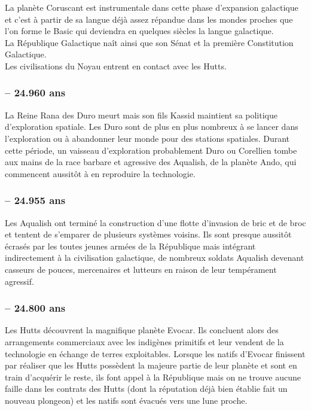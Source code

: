 \documentclass[twoside]{article}
\begin{document}
La planète Coruscant est instrumentale dans cette phase d'expansion galactique et c'est à partir de sa langue déjà assez répandue dans les mondes proches que l'on forme le Basic qui deviendra en quelques siècles la langue galactique. \\

La République Galactique na\^{i}t ainsi que son Sénat et la première Constitution Galactique. \\

Les civilisations du Noyau entrent en contact avec les Hutts. 
\subsubsection*{-- 24.960 ans}
La Reine Rana des Duro meurt mais son fils Kassid maintient sa politique d'exploration spatiale. Les Duro sont de plus en plus nombreux à se lancer dans l'exploration ou à abandonner leur monde pour des stations spatiales. Durant cette période, un vaisseau d'exploration probablement Duro ou Corellien tombe aux mains de la race barbare et agressive des Aqualish, de la planète Ando, qui commencent aussitôt à en reproduire la technologie. 
\subsubsection*{-- 24.955 ans}
Les Aqualish ont terminé la construction d'une flotte d'invasion de bric et de broc et tentent de s'emparer de plusieurs systèmes voisins. Ils sont presque aussitôt écrasés par les toutes jeunes armées de la République mais intégrant indirectement à la civilisation galactique, de nombreux soldats Aqualish devenant casseurs de pouces, mercenaires et lutteurs en raison de leur tempérament agressif.
\subsubsection*{-- 24.800 ans}
Les Hutts découvrent la magnifique planète Evocar. Ils concluent alors des arrangements commerciaux avec les indigènes primitifs et leur vendent de la technologie en échange de terres exploitables. Lorsque les natifs d'Evocar finissent par réaliser que les Hutts possèdent la majeure partie de leur planète et sont en train d'acquérir le reste, ils font appel à la République mais on ne trouve aucune faille dans les contrats des Hutts (dont la réputation déjà bien établie fait un nouveau plongeon) et les natifs sont évacués vers une lune proche. \\
\end{document}

